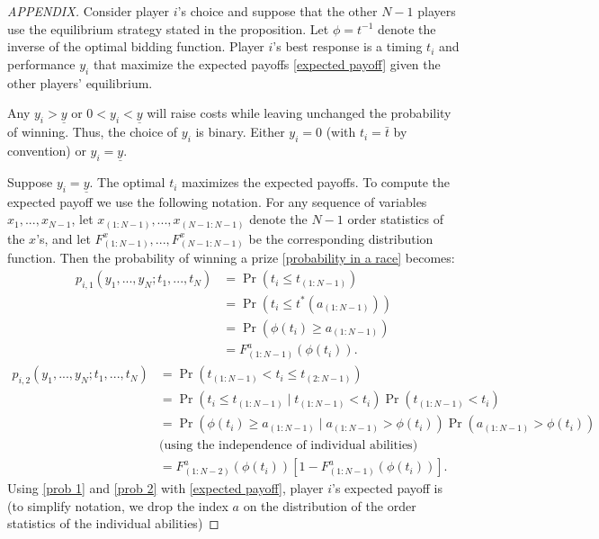 \documentclass[12pt,]{article}
\newcommand\deadline{\bar{t}}
\newcommand\target{\underline{y}}
\begin{document}
\begin{shaded}
\begin{proof}[APPENDIX]
Consider player $i$'s choice and suppose that the other $N-1$ players use the equilibrium strategy stated in the proposition. Let $\phi=t^{-1}$ denote the inverse of the optimal bidding function. Player $i$'s best response is a timing $t_i$ and performance $y_i$ that maximize the expected payoffs \eqref{expected payoff} given the other players' equilibrium. 

Any $y_i > \target$ or $0<y_i<\target$ will raise costs while leaving unchanged the probability of winning. Thus, the choice of $y_i$ is binary. Either $y_i=0$ (with $t_i=\deadline$ by convention) or $y_i= \target$.

Suppose $y_i=\target$. The optimal $t_i$ maximizes the expected payoffs. To compute the expected payoff we use the following notation. For any sequence of variables $x_1, ..., x_{N-1}$,  let $x_{(1:N-1)}, ..., x_{(N-1:N-1)}$ denote the $N-1$ order statistics of the $x$'s, and let $F^x_{(1:N-1)}, ..., F^x_{(N-1:N-1)}$ be the corresponding distribution function. Then the probability of winning a prize \eqref{probability in a race} becomes:
\begin{align} \label{prob 1}
  p_{i, 1}(y_1,..., y_N; t_1,..., t_N)
    & = \Pr(t_i \leq t_{(1:N-1)}) \nonumber\\
    & = \Pr(t_i \leq t^*(a_{(1:N-1)})) \nonumber\\
    & = \Pr(\phi(t_i) \geq a_{(1:N-1)}) \nonumber\\
    & = F^a_{(1:N-1)}(\phi(t_i)).
\end{align}
\begin{align} \label{prob 2}
  p_{i, 2}(y_1,..., y_N; t_1,..., t_N) 
    & = \Pr(t_{(1:N-1)} < t_i \leq t_{(2:N-1)})  \nonumber\\
    & = \Pr(t_i\leq t_{(1:N-1)}\mid t_{(1:N-1)}<t_i) \Pr(t_{(1:N-1)} < t_i) \nonumber\\
    & = \Pr(\phi(t_i)\geq a_{(1:N-1)} \mid a_{(1:N-1)} > \phi(t_i)) \Pr(a_{(1:N-1)} > \phi(t_i)) \nonumber\\
    & \text{(using the independence of individual abilities)}\nonumber\\
    & = F^a_{(1:N-2)}(\phi(t_i))\left[1 - F^a_{(1:N-1)}(\phi(t_i))\right].
\end{align}
Using \eqref{prob 1} and \eqref{prob 2} with \eqref{expected payoff}, player $i$'s expected payoff is (to simplify notation, we drop the index $a$ on the distribution of the order statistics of the individual abilities)

\end{proof}
\end{shaded}
\end{document}
